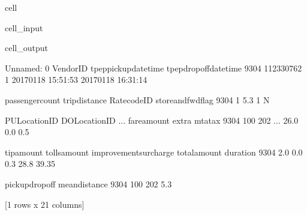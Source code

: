 \documentclass[letterpaper,10pt,english]{sphinxmanual}
\begin{document}
\begin{sphinxuseclass}{cell}
\begin{sphinxuseclass}{cell_input}
\begin{sphinxVerbatim}[commandchars=\\\{\}]
\PYG{p}{[}\PYG{p}{]}  \PYG{p}{[}\PYG{p}{]}
\PYG{p}{[}\PYG{p}{]}  \PYG{p}{[}\PYG{p}{]}

\PYG{p}{[}\PYG{p}{[}\PYG{p}{]}    \PYG{p}{[}\PYG{p}{]}  \PYG{p}{]}
\end{sphinxVerbatim}

\end{sphinxuseclass}
\begin{sphinxuseclass}{cell_output}
\begin{sphinxVerbatim}[commandchars=\\\{\}]
      Unnamed: 0  VendorID tpep\PYGZus{}pickup\PYGZus{}datetime tpep\PYGZus{}dropoff\PYGZus{}datetime  \PYGZbs{}
9304   112330762         1  2017\PYGZhy{}01\PYGZhy{}18 15:51:53   2017\PYGZhy{}01\PYGZhy{}18 16:31:14   

      passenger\PYGZus{}count  trip\PYGZus{}distance  RatecodeID store\PYGZus{}and\PYGZus{}fwd\PYGZus{}flag  \PYGZbs{}
9304                1            5.3           1                  N   

      PULocationID  DOLocationID  ...  fare\PYGZus{}amount  extra  mta\PYGZus{}tax  \PYGZbs{}
9304           100           202  ...         26.0    0.0      0.5   

      tip\PYGZus{}amount  tolls\PYGZus{}amount  improvement\PYGZus{}surcharge  total\PYGZus{}amount  duration  \PYGZbs{}
9304         2.0           0.0                    0.3          28.8     39.35   

      pickup\PYGZus{}dropoff mean\PYGZus{}distance  
9304         100 202           5.3  

[1 rows x 21 columns]
\end{sphinxVerbatim}

\end{sphinxuseclass}
\end{sphinxuseclass}
\end{document}
